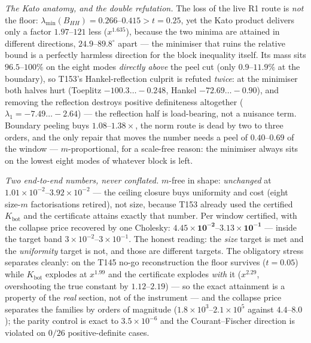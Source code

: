 \documentclass[11pt,a4paper]{article}
\begin{document}
\emph{The Kato anatomy, and the double refutation.} The loss of the live R1 route is
\emph{not} the floor: $\lambda_{\min}(B_{HH})=0.266$--$0.415>t=0.25$, yet the Kato product
delivers only a factor $1.97$--$121$ less ($x^{1.635}$), because the two minima are
attained in different directions, $24.9$--$89.8^\circ$ apart --- the minimiser that ruins
the relative bound is a perfectly harmless direction for the block inequality itself.
Its mass sits $96.5$--$100\%$ on the eight modes \emph{directly above} the peel cut (only
$0.9$--$11.9\%$ at the boundary), so T153's Hankel-reflection culprit is refuted
\emph{twice}: at the minimiser both halves hurt (Toeplitz $-100.3\ldots-0.248$, Hankel
$-72.69\ldots-0.90$), and removing the reflection destroys positive definiteness
altogether ($\lambda_1=-7.49\ldots-2.64$) --- the reflection half is load-bearing, not a
nuisance term. Boundary peeling buys $1.08$--$1.38\times$, the norm route is dead by two
to three orders, and the only repair that moves the number needs a peel of $0.40$--$0.69$
of the window --- $m$-proportional, for a scale-free reason: the minimiser always sits on
the lowest eight modes of whatever block is left.

\emph{Two end-to-end numbers, never conflated.} $m$-free in shape: \emph{unchanged} at
$1.01\times10^{-2}$--$3.92\times10^{-2}$ --- the ceiling closure buys uniformity and cost
(eight size-$m$ factorisations retired), not size, because T153 already used the certified
$K_{\mathrm{bot}}$ and the certificate attains exactly that number. Per window certified,
with the collapse price recovered by one Cholesky:
$\mathbf{4.45\times10^{-2}}$--$\mathbf{3.13\times10^{-1}}$ --- inside the target band
$3\times10^{-2}$--$3\times10^{-1}$. The honest reading: the \emph{size} target is met and
the \emph{uniformity} target is not, and those are different targets. The obligatory
stress separates cleanly: on the T145 no-go reconstruction the floor survives ($t=0.05$)
while $K_{\mathrm{bot}}$ explodes at $x^{1.99}$ and the certificate explodes \emph{with}
it ($x^{2.29}$, overshooting the true constant by $1.12$--$2.19$) --- so the exact
attainment is a property of the \emph{real} section, not of the instrument --- and the
collapse price separates the families by orders of magnitude ($1.8\times10^{3}$--$2.1
\times10^{5}$ against $4.4$--$8.0$); the parity control is exact to $3.5\times10^{-6}$
and the Courant--Fischer direction is violated on $0/26$ positive-definite cases.
\end{document}
